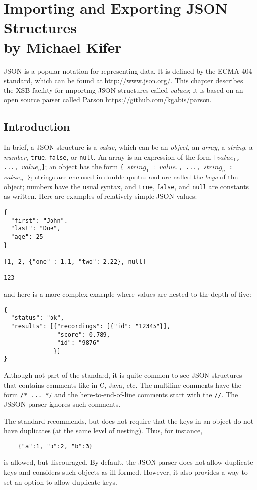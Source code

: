 \chapter[Importing JSON Structures]
{Importing and Exporting JSON Structures\\
  {\Large by Michael Kifer}}

JSON is a popular notation for representing data. It is defined
by the ECMA-404 standard, which can be found at \url{http://www.json.org/}.
This chapter describes the XSB facility for importing JSON structures
called \emph{values}; it is based on an open source parser called Parson
\url{https://github.com/kgabis/parson}.

\section{Introduction}

In brief, a JSON structure is a \emph{value}, which can be
an \emph{object}, an
\emph{array}, a \emph{string}, a \emph{number},  \texttt{true}, \texttt{false},
or \texttt{null}. An array is an expression of the form
\texttt{[$value_1$, ..., $value_n$]}; an object has the form
\texttt{\{ $string_1$ : $value_1$,  ..., $string_n$ : $value_n$
  \}}; strings are enclosed in double quotes and are called the \emph{keys}
of the object; numbers have the usual
syntax, and \texttt{true}, \texttt{false}, and \texttt{null} are constants
as written. Here are examples of relatively simple JSON values:
\begin{verbatim}
{
  "first": "John",
  "last": "Doe",
  "age": 25
}

[1, 2, {"one" : 1.1, "two": 2.22}, null]

123
\end{verbatim}
and here is a more complex example where values are nested to the depth of
five:
\begin{verbatim}
{
  "status": "ok",
  "results": [{"recordings": [{"id": "12345"}],
               "score": 0.789,
               "id": "9876"
              }]
}
\end{verbatim}

Although not part of the standard, it is quite common to see JSON
structures that contains comments like in C, Java, etc. The multiline
comments have the form \texttt{/* ... */} and the here-to-end-of-line
comments start with the \texttt{//}. The JSSON parser ignores such comments.

The standard recommends, but does not require that the keys in an object
do not have duplicates (at the same level of nesting). Thus, for instance,
\begin{verbatim}
    {"a":1, "b":2, "b":3}
\end{verbatim}
is allowed, but discouraged. By default, the JSON parser does not allow
duplicate keys and considers such objects as ill-formed. However, it also
provides a way to set an option to allow duplicate keys.


